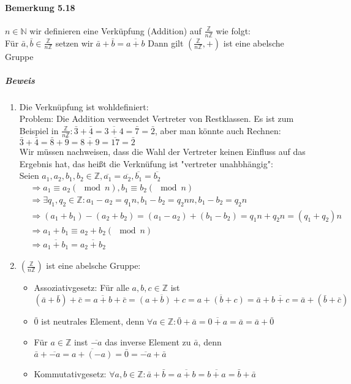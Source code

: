 \documentclass[a4paper]{scrartcl}
\DeclareMathOperator{\Forall}{\forall}
\theoremstyle{definition}
\theoremstyle{plain}
\theoremstyle{plain}
\theoremstyle{remark}
\theoremstyle{remark}
\theoremstyle{remark}
\begin{document}
\paragraph{Bemerkung 5.18}
\label{sec-3-1-7-4}
$n\in\mathbb{N}$ wir definieren eine Verküpfung (Addition) auf $\frac{\mathbb{Z}}{n\mathbb{Z}}$ wie folgt: \\
     Für $\bar a,\bar b \in\frac{\mathbb{Z}}{n\mathbb{Z}}$ setzen wir $\bar a + \bar b = \overline{a + b}$
Dann gilt $(\frac{\mathbb{Z}}{n\mathbb{Z}},+)$ ist eine abelsche Gruppe
\subparagraph{Beweis}
\label{sec-3-1-7-4-1}
\begin{enumerate}
\item Die Verknüpfung ist wohldefiniert: \\ Problem: Die Addition verweendet Vertreter von Restklassen. Es ist zum Beispiel in $\frac{\mathbb{Z}}{n\mathbb{Z}}: \bar 3 + \bar 4 = \overline{3 + 4} = \bar 7 = \bar 2$, aber man könnte auch Rechnen:
$\bar 3 + \bar 4 = \bar 8 + \bar 9 = \overline{8 + 9} = \overline{17} = \bar 2$ \\
         Wir müssen nachweisen, dass die Wahl der Vertreter keinen Einfluss auf das Ergebnis hat, das heißt die Verknüfung ist "vertreter unahbhängig": \\
         Seien $a_1,a_2 ,b_1,b_2 \in\mathbb{Z},\overline{a_1} = \overline{a_2},\overline{b_1} = \overline{b_2}$
\begin{align}
&\Rightarrow a_1 \equiv a_2(\mod n), b_1 \equiv b_2(\mod n) \\
&\Rightarrow\exists q_1,q_2\in\mathbb{Z}: a_1 - a_2 = q_1 n, b_1 - b_2 = q_2 n n, b_1 - b_2 = q_2 n \\
&\Rightarrow (a_1 + b_1) - (a_2 + b_2) = (a_1 - a_2)+ (b_1 - b_2) = q_1 n + q_2 n = (q_1 + q_2) n \\
&\Rightarrow a_1 + b_ 1 \equiv a_2 + b_2 (\mod n) \\
&\Rightarrow \overline{a_1 + b_1} = \overline{a_2 + b_2}
\end{align}
\item $(\frac{\mathbb{Z}}{n\mathbb{Z}})$ ist eine abelsche Gruppe:
\begin{itemize}
\item Assoziativgesetz: Für alle $a,b,c\in\mathbb{Z}$ ist
\[(\bar a + \bar b) + \bar c = \overline{a + b} + \bar c = \overline{(a + b) + c} = \overline{a + (b + c)} = \bar a + \overline{b + c} = \bar a + (\bar b + \bar c)\]
\item $\bar 0$ ist neutrales Element, denn $\Forall a\in\mathbb{Z}:\bar 0 + \bar a = \overline{0 + a} = \bar a = \bar a + \bar 0$
\item Für $a\in\mathbb{Z}$ inst $\overline{-a}$ das inverse Element zu $\bar a$, denn $\bar a + \overline{-a} = \overline{a + (- a)} = \bar 0 = \overline{-a} + \bar a$
\item Kommutativgesetz: $\Forall a,b\in\mathbb{Z}:\bar a + \bar b = \overline{a + b} = \overline{b + a} = \bar b + \bar a$
\end{itemize}
\end{enumerate}
\end{document}
